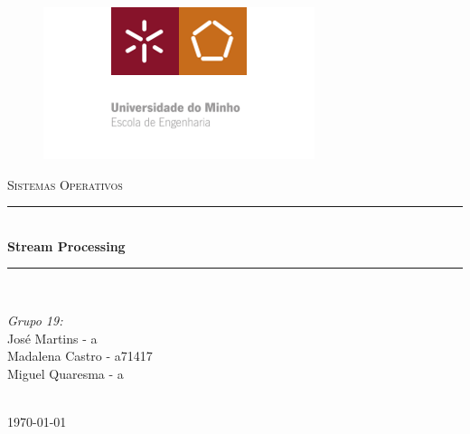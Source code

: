 \documentclass[12pt]{article}
\begin{document}

\begin{titlepage}

\newcommand{\HRule}{\rule{\linewidth}{0.5mm}} 
\center
\begin{figure}[ht!]
	\centering
	\includegraphics[scale=3]{DI.png}
\end{figure}

\textsc{\large Sistemas Operativos}\\[0.5cm] 
\HRule \\[0.4cm]
{ \huge \bfseries Stream Processing}\\[0.4cm] 
\HRule \\[1.5cm]


\begin{center} \large
\emph{Grupo 19:}\\
José Martins - a\\
Madalena Castro - a71417\\
Miguel Quaresma - a\\
\end{center}

\begin{minipage}{0.4\textwidth}
\end{minipage}\\[4cm]

{\large \today}\\[3cm] 
\vfill
\end{titlepage}


\tableofcontents 

\newpage

\end{document}
